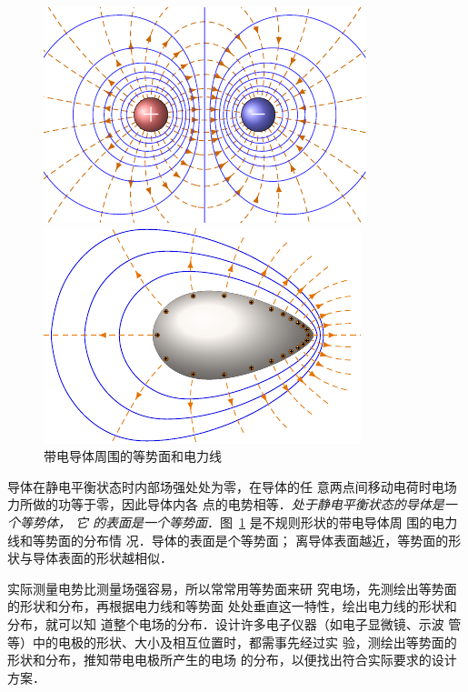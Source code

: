 \begin{figure}[htbp]
    \centering
    \begin{minipage}[t]{0.48\textwidth}
        \centering
        \includegraphics{fig/B/6-21.pdf}
        \caption{}\label{fig_B_6-21}
    \end{minipage}
    \begin{minipage}[t]{0.48\textwidth}
        \centering
        \includegraphics[scale=1.1]{fig/B/6-22.pdf}
        \caption{带电导体周围的等势面和电力线}\label{fig_B_6-22}
    \end{minipage}
\end{figure}

导体在静电平衡状态时内部场强处处为零，在导体的任
意两点间移动电荷时电场力所做的功等于零，因此导体内各
点的电势相等．\textit{处于静电平衡状态的导体是一个等势体，
它
的表面是一个等势面}．图~\ref{fig_B_6-22} 
是不规则形状的带电导体周
围的电力线和等势面的分布情
况．导体的表面是个等势面；
离导体表面越近，等势面的形
状与导体表面的形状越相似．

实际测量电势比测量场强容易，所以常常用等势面来研
究电场，先测绘出等势面的形状和分布，再根据电力线和等势面
处处垂直这一特性，绘出电力线的形状和分布，就可以知
道整个电场的分布．设计许多电子仪器（如电子显微镜、示波
管等）中的电极的形状、大小及相互位置时，都需事先经过实
验，测绘出等势面的形状和分布，推知带电电极所产生的电场
的分布，以便找出符合实际要求的设计方案．


